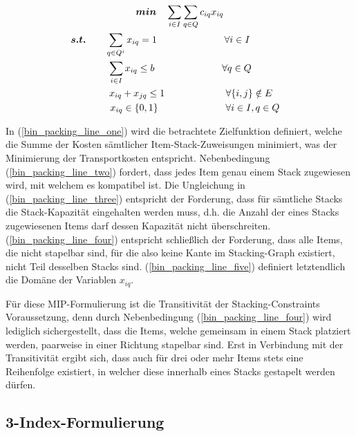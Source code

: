 \vfill
\pagebreak

\begin{gather}
\boldsymbol{min} \quad \sum_{i \in I} \sum_{q \in Q} c_{iq} x_{iq} \label{bin_packing_line_one} \\
\thinspace\thinspace \boldsymbol{s.t.} \quad \quad \sum_{q \in Q^i} x_{iq} = 1 \quad\quad\quad\quad\quad\quad\quad \forall i \in I \quad\quad\quad\quad\thinspace\thinspace \label{bin_packing_line_two} \\
\thinspace \sum_{i \in I} x_{iq} \leq b \quad\quad\quad\quad\quad\quad\quad \forall q \in Q \label{bin_packing_line_three} \\
\thinspace\thinspace\quad\quad x_{iq} + x_{jq} \leq 1 \quad\quad\thinspace\thinspace\quad\quad\quad\quad \forall \{i, j\} \notin E \label{bin_packing_line_four} \\
\thinspace\thinspace\quad\quad\quad x_{iq} \in \{0, 1\} \thinspace\thinspace\thinspace\thinspace\thinspace\thinspace\quad\quad\quad\quad\quad\quad \forall i \in I, q \in Q \thinspace \label{bin_packing_line_five}
\end{gather}

In (\ref{bin_packing_line_one}) wird die betrachtete Zielfunktion definiert, welche die Summe der Kosten sämtlicher
Item-Stack-Zuweisungen minimiert, was der Minimierung der Transportkosten entspricht.
Nebenbedingung (\ref{bin_packing_line_two}) fordert, dass jedes Item genau einem Stack zugewiesen wird, mit welchem es kompatibel ist.
Die Ungleichung in (\ref{bin_packing_line_three}) entspricht der Forderung, dass für sämtliche Stacks die Stack-Kapazität eingehalten werden muss, d.h.
die Anzahl der eines Stacks zugewiesenen Items darf dessen Kapazität nicht überschreiten. (\ref{bin_packing_line_four}) entspricht schließlich der Forderung, dass alle Items, die nicht stapelbar sind, für die also keine Kante im Stacking-Graph existiert, nicht Teil desselben Stacks sind. (\ref{bin_packing_line_five}) definiert letztendlich die Domäne der Variablen $x_{iq}$.

Für diese MIP-Formulierung ist die Transitivität der Stacking-Constraints Voraussetzung, denn durch Nebenbedingung (\ref{bin_packing_line_four}) wird lediglich sichergestellt, dass die Items, welche gemeinsam in einem Stack platziert werden,
paarweise in einer Richtung stapelbar sind. Erst in Verbindung mit der Transitivität ergibt sich, dass auch für drei oder
mehr Items stets eine Reihenfolge existiert, in welcher diese innerhalb eines Stacks gestapelt werden dürfen.

\subsection{3-Index-Formulierung}
\label{sec:three_idx_formulation}

